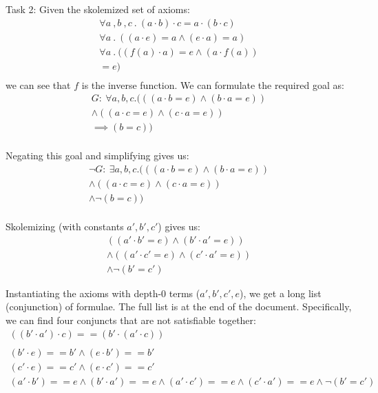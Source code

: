 \documentclass[12pt,letterpaper, onecolumn]{exam}
\begin{document}
\begin{questions}
	Task 2:
	Given the skolemized set of axioms:
	\begin{align*}
		\forall a \:, b \:, c \:.\: (a \cdot b) \cdot c = a \cdot (b \cdot c) \\
		\forall a \:.\: ((a \cdot e) = a \land (e \cdot a) = a) \\
		\forall a \:.\: ((f(a)\cdot a) = e \land (a \cdot f(a))  \\ = e) \\
	\end{align*}
	we can see that $f$ is the inverse function. 
	We can formulate the required goal as:
	\begin{align*}
		G : \: \forall a, b, c . (((a \cdot b = e) \land (b \cdot a = e))  \\ \land (
			(a \cdot c = e) \land (c \cdot a = e))  \\ \implies (b = c))  \\
	\end{align*}

	Negating this goal and simplifying gives us:
	\begin{align*}
		\neg G : \: \exists a, b, c . (((a \cdot b = e) \land (b \cdot a = e))  \\ \land (
			(a \cdot c = e) \land (c \cdot a = e))  \\ \land \neg(b = c))  \\
	\end{align*}

	Skolemizing (with constants $a', b', c'$) gives us:
	\begin{align*}
		((a' \cdot b' = e) \land (b' \cdot a' = e))  \\ \land (
			(a' \cdot c' = e) \land (c' \cdot a' = e))  \\ \land \neg(b' = c')
	\end{align*}

	Instantiating the axioms with depth-0 terms ($a', b', c', e$), we get a long list (conjunction) of formulae. The full list is at the end of the document.
	Specifically, we can find four conjuncts that are not satisfiable together:
	\begin{align*}
		((b' \cdot a') \cdot c) == (b' \cdot (a' \cdot c))  \\ \\
		(b' \cdot e) == b' \land (e \cdot b') == b' \\
		(c' \cdot e) == c' \land (e \cdot c') == c' \\
		(a' \cdot b') == e \land (b' \cdot a') == e \land (a' \cdot c') == e \land (c' \cdot a') == e \land \neg(b' = c')
	\end{align*}


\end{questions}
\end{document}
